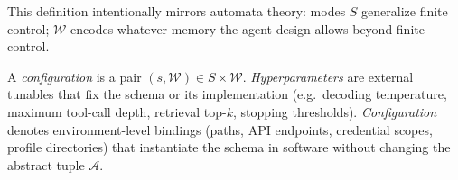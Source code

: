 \begin{remark}
This definition intentionally mirrors automata theory: modes $S$ generalize finite control; $\mathcal{W}$ encodes whatever memory the agent design allows beyond finite control.
\end{remark}

\begin{definition}
\label{def:hyper}
A \emph{configuration} is a pair $(s,\mathcal{W}) \in S \times \mathcal{W}$. \emph{Hyperparameters} are external tunables that fix the schema or its implementation (e.g.\ decoding temperature, maximum tool-call depth, retrieval top-$k$, stopping thresholds). \emph{Configuration} denotes environment-level bindings (paths, API endpoints, credential scopes, profile directories) that instantiate the schema in software without changing the abstract tuple $\mathcal{A}$.
\end{definition}

